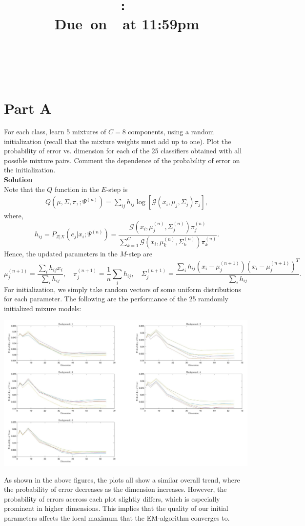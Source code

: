 \documentclass{article}
\title{
    \vspace{2in}
    \textmd{\textbf{\hmwkClass:\ \hmwkTitle}}\\
    \normalsize\vspace{0.1in}\small{Due\ on\ \hmwkDueDate\ at 11:59pm}\\
    \vspace{0.1in}\large{\textit{\hmwkClassInstructor}} \\
    \vspace{3in}
}
\author{
  \hmwkAuthorName \\
  \vspace{0.1in}\small\hmwkPID
}
\date{}
\newcommand*{\G}{\mathcal{G}}
\begin{document}
\maketitle

\pagebreak

\section*{Part A}

For each class, learn 5 mixtures of $C = 8$ components, using a random initialization (recall that the
mixture weights must add up to one). Plot the probability of error vs. dimension for each of the 25
classifiers obtained with all possible mixture pairs. Comment the dependence of the probability of error
on the initialization.
\\

\textbf{\large Solution}
\\

Note that the $Q$ function in the $E$-step is
\begin{align*}
    Q(\mu, \Sigma, \pi, ; \Psi^{(n)}) = \sum_{ij} h_{ij} \log[\G(x_i, \mu_j, \Sigma_j)\pi_j],
\end{align*}
where,
\[
    h_{ij} = P_{Z|X}(e_j | x_i ; \Psi^{(n)}) = \frac{\G(x_i, \mu_j^{(n)}, \Sigma_j^{(n)})\pi_j^{(n)}}{\sum_{k = 1}^C \G(x_i, \mu_k^{(n)}, \Sigma_k^{(n)})\pi_k^{(n)}}.
\]
Hence, the updated parameters in the $M$-step are
\[
    \mu_j^{(n + 1)} = \frac{\sum_i h_{ij}x_i}{\sum_i h_{ij}}, \quad \pi_j^{(n + 1)} = \frac{1}{n}\sum_i h_{ij}, \quad \Sigma_j^{(n + 1)} = \frac{\sum_i h_{ij} (x_i - \mu_j^{(n + 1)})(x_i - \mu_j^{(n + 1)})^T}{\sum_i h_{ij}}.
\]
For initialization, we simply take random vectors of some uniform distributions for each parameter.
The following are the performance of the 25 ramdomly initialized mixure models:
\begin{center}
    \includegraphics[width=0.99\textwidth]{partA}
\end{center}
As shown in the above figures, the plots all show a similar overall trend, where the probability of error decreases as the dimension increases.
However, the probability of errors accross each plot slightly differs, which is especially prominent in higher dimensions.
This implies that the quality of our initial parameters affects the local maximum that the EM-algorithm converges to.
\\
\end{document}
